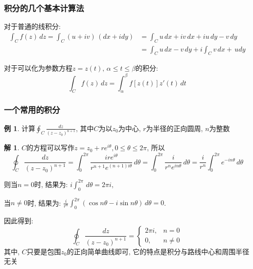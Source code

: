 \documentclass[12pt, a4paper, oneside]{ctexart}
\theoremstyle{plain}
\theoremstyle{definition}
\newtheorem{example}{例}
\theoremstyle{definition}
\newtheorem*{solution}{解}
\begin{document}
\subsubsection{积分的几个基本计算法}
对于普通的线积分:
\begin{align*}
    \int_{C}f(z)\,dz=\int_{C}(u+iv)\,(dx+idy) &= \int_{C}u\,dx+iv\,dx+iu\,dy-v\,dy \\
    &= \int_{C}u\,dx-v\,dy+i\int_{C}v\,dx+\,udy
\end{align*}

对于可以化为参数方程$z=z(t),\,\alpha\leq t\leq\beta$的积分:
\[
    \int_{C}f(z)\,dz=\int_{\alpha}^{\beta}f[z(t)]z'(t)\,dt
\]
\subsubsection{一个常用的积分}
\begin{example}
    计算$\oint_{C}\frac{dz}{(z-z_{0})^{n+1}}$, 其中$C$为以$z_{0}$为中心, $r$为半径的正向圆周, $n$为整数
\end{example}
\begin{solution}
    $C$的方程可以写作$z=z_{0}+re^{i\theta},0\leq\theta\leq2\pi$, 所以
    \[
        \oint_{C}\frac{dz}{(z-z_{0})^{n+1}}=\int_{0}^{2\pi}\frac{ire^{i\theta}}{r^{n+1}e^{(n+1)i\theta}}\,d\theta
        =\int_{0}^{2\pi}\frac{i}{r^{n}e^{in\theta}}\,d\theta=\frac{i}{r^{n}}\int_{0}^{2\pi}e^{-in\theta}\,d\theta
    \]

    则当$n=0$时, 结果为: $i\int_{0}^{2\pi}\,d\theta=2\pi i$,

    当$n\neq0$时, 结果为: $\frac{i}{r^{n}}\int_{0}^{2\pi}(\cos n\theta-i\sin n\theta)\,d\theta=0$.
\end{solution}
    \noindent 因此得到: 
    \[
        \oint_{C}\frac{dz}{(z-z_{0})^{n+1}}=
        \begin{cases}
            2\pi i, & n=0\\
            0, &n\neq 0
        \end{cases}
    \]
    其中, $C$只要是包围$z_{0}$的正向简单曲线即可, 它的特点是积分与路线中心和周围半径无关
\end{document}
